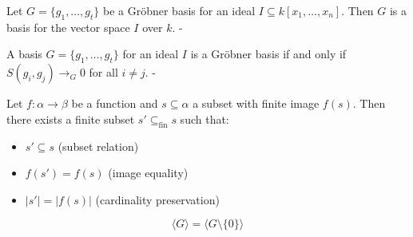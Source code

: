 \begin{lemma}\label{groebner_basis_is_basis}

  Let \( G = \{g_1, \ldots, g_t\} \) be a Gröbner basis for an ideal \( I \subseteq k[x_1, \ldots, x_n] \). Then \( G \) is a basis for the vector space \( I \) over \( k \).
-
\end{lemma}

\begin{lemma}\label{buchberger_criterion}

  A basis \( G = \{ g_1, \ldots, g_t \} \) for an ideal \( I \) is a Gröbner basis if and only if \( S(g_i, g_j) \to_G 0 \) for all \( i \neq j \).
-
\end{lemma}

\begin{lemma}\label{finset_subset_preimage_of_finite_image}

  \leanok
  Let $f: \alpha \to \beta$ be a function and $s \subseteq \alpha$ a subset with finite image $f(s)$. Then there exists a finite subset $s' \subseteq_{\text{fin}} s$ such that:
\begin{itemize}
\item $s' \subseteq s$ (subset relation)
\item $f(s') = f(s)$ (image equality)
\item $|s'| = |f(s)|$ (cardinality preservation)
\end{itemize}

\end{lemma}

\begin{lemma}\label{span_sdiff_singleton_zero}

  \leanok
  \[
\langle G \rangle = \langle G \setminus \{0\} \rangle
\]

\end{lemma}
